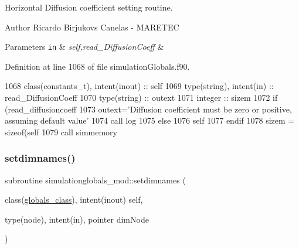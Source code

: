 Horizontal Diffusion coefficient setting routine. 

\begin{DoxyAuthor}{Author}
Ricardo Birjukovs Canelas -\/ M\+A\+R\+E\+T\+EC 
\end{DoxyAuthor}

\begin{DoxyParams}[1]{Parameters}
\mbox{\tt in}  & {\em self,read\+\_\+\+Diffusion\+Coeff} & \\
\hline
\end{DoxyParams}


Definition at line 1068 of file simulation\+Globals.\+f90.


\begin{DoxyCode}
1068     \textcolor{keywordtype}{class}(constants\_t), \textcolor{keywordtype}{intent(inout)} :: self
1069     \textcolor{keywordtype}{type}(string), \textcolor{keywordtype}{intent(in)} :: read\_DiffusionCoeff
1070     \textcolor{keywordtype}{type}(string) :: outext
1071     \textcolor{keywordtype}{integer} :: sizem
1072     \textcolor{keywordflow}{if} (read\_diffusioncoeff%
1073         outext=\textcolor{stringliteral}{'Diffusion coefficient must be zero or positive, assuming default value'}
1074         \textcolor{keyword}{call }log%
1075     \textcolor{keywordflow}{else}
1076         self%
1077 \textcolor{keywordflow}{    endif}
1078     sizem = sizeof(self%
1079     \textcolor{keyword}{call }simmemory%
\end{DoxyCode}
\mbox{\label{namespacesimulationglobals__mod_a878fdcfa67037a1bc8411995394c2bef}} 
\subsubsection{\texorpdfstring{setdimnames()}{setdimnames()}}
{\footnotesize\ttfamily subroutine simulationglobals\+\_\+mod\+::setdimnames (\begin{DoxyParamCaption}\item[{class(\mbox{\hyperlink{structsimulationglobals__mod_1_1globals__class}{globals\+\_\+class}}), intent(inout)}]{self,  }\item[{type(node), intent(in), pointer}]{dim\+Node }\end{DoxyParamCaption})\hspace{0.3cm}{\ttfamily [private]}}



